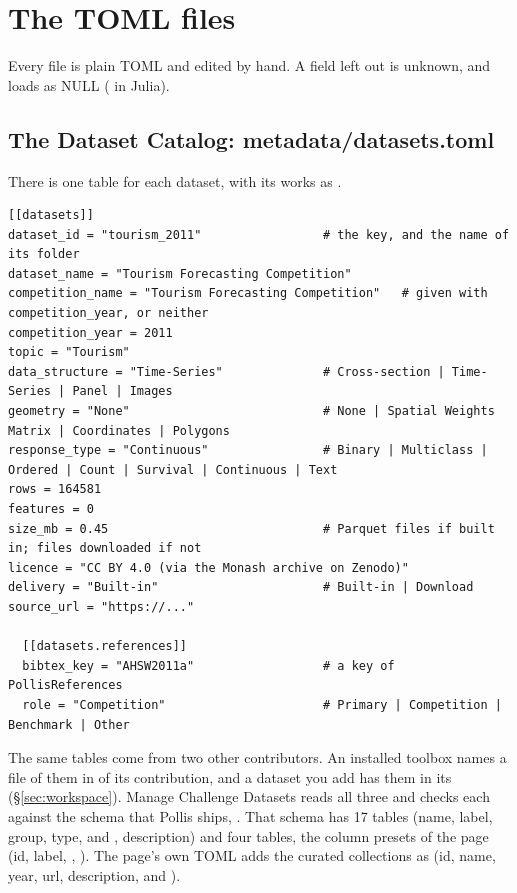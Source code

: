 \section{The TOML files}
\label{sec:toml}

Every file is plain TOML and edited by hand. A field left out is unknown, and loads as NULL ( in Julia).

\subsection{The Dataset Catalog: metadata/datasets.toml}

There is one \file{[[datasets]]} table for each dataset, with its works as .

\begin{lstlisting}
[[datasets]]
dataset_id = "tourism_2011"                 # the key, and the name of its folder
dataset_name = "Tourism Forecasting Competition"
competition_name = "Tourism Forecasting Competition"   # given with competition_year, or neither
competition_year = 2011
topic = "Tourism"
data_structure = "Time-Series"              # Cross-section | Time-Series | Panel | Images
geometry = "None"                           # None | Spatial Weights Matrix | Coordinates | Polygons
response_type = "Continuous"                # Binary | Multiclass | Ordered | Count | Survival | Continuous | Text
rows = 164581
features = 0
size_mb = 0.45                              # Parquet files if built in; files downloaded if not
licence = "CC BY 4.0 (via the Monash archive on Zenodo)"
delivery = "Built-in"                       # Built-in | Download
source_url = "https://..."

  [[datasets.references]]
  bibtex_key = "AHSW2011a"                  # a key of PollisReferences
  role = "Competition"                      # Primary | Competition | Benchmark | Other
\end{lstlisting}

The same \file{[[datasets]]} tables come from two other contributors. An installed toolbox names a file of them in
 of its  contribution, and a dataset you add has them in its
 (\S\ref{sec:workspace}). Manage Challenge Datasets reads all three and checks each against the
schema that Pollis ships, . That schema has 17
\file{[[field]]} tables (name, label, group, type,  and , description) and four
\file{[[view]]} tables, the column presets of the page (id, label, , ). The page's own TOML
adds the curated collections as \file{[[collections]]} (id, name, year, url, description,  and
).

